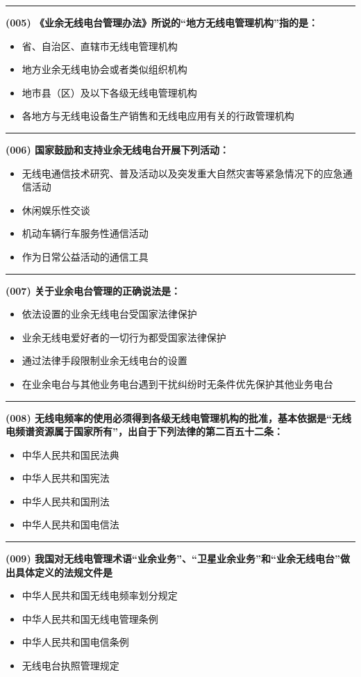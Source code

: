\documentclass[twocolumn]{ctexart}  %
\begin{document}
\noindent\rule{0.5\textwidth}{1pt}
\heiti \textbf{(005) 《业余无线电台管理办法》所说的“地方无线电管理机构”指的是：} \songti {\color{gray} [LK0005] }
\begin{itemize}
	\item  省、自治区、直辖市无线电管理机构
	\item  地方业余无线电协会或者类似组织机构
	\item  地市县（区）及以下各级无线电管理机构
	\item  各地方与无线电设备生产销售和无线电应用有关的行政管理机构
\end{itemize}


\noindent\rule{0.5\textwidth}{1pt}
\heiti \textbf{(006) 国家鼓励和支持业余无线电台开展下列活动：} \songti {\color{gray} [LK0011] }
\begin{itemize}
	\item  无线电通信技术研究、普及活动以及突发重大自然灾害等紧急情况下的应急通信活动
	\item  休闲娱乐性交谈
	\item  机动车辆行车服务性通信活动
	\item  作为日常公益活动的通信工具
\end{itemize}


\noindent\rule{0.5\textwidth}{1pt}
\heiti \textbf{(007) 关于业余电台管理的正确说法是：} \songti {\color{gray} [LK0012] }
\begin{itemize}
	\item  依法设置的业余无线电台受国家法律保护
	\item  业余无线电爱好者的一切行为都受国家法律保护
	\item  通过法律手段限制业余无线电台的设置
	\item  在业余电台与其他业务电台遇到干扰纠纷时无条件优先保护其他业务电台
\end{itemize}


\noindent\rule{0.5\textwidth}{1pt}
\heiti \textbf{(008) 无线电频率的使用必须得到各级无线电管理机构的批准，基本依据是“无线电频谱资源属于国家所有”，出自于下列法律的第二百五十二条： } \songti {\color{gray} [LK0104] }
\begin{itemize}
	\item  中华人民共和国民法典
	\item  中华人民共和国宪法
	\item  中华人民共和国刑法
	\item  中华人民共和国电信法
\end{itemize}


\noindent\rule{0.5\textwidth}{1pt}
\heiti \textbf{(009) 我国对无线电管理术语“业余业务”、“卫星业余业务”和“业余无线电台”做出具体定义的法规文件是 } \songti {\color{gray} [LK0007] }
\begin{itemize}
	\item  中华人民共和国无线电频率划分规定
	\item  中华人民共和国无线电管理条例
	\item  中华人民共和国电信条例
	\item  无线电台执照管理规定
\end{itemize}
\end{document}
